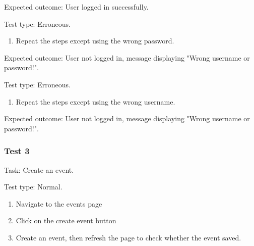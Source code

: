 {\sffamily Expected outcome:} User logged in successfully. \\

{\color{gray} \hrulefill}

{\sffamily Test type: Erroneous.}\\

\begin{enumerate}
  \item Repeat the steps except using the wrong password.
\end{enumerate}

{\sffamily Expected outcome:} User not logged in,
message displaying "Wrong username or password!". \\

{\color{gray} \hrulefill}

{\sffamily Test type: Erroneous.}\\

\begin{enumerate}
  \item Repeat the steps except using the wrong username.
\end{enumerate}

{\sffamily Expected outcome:} User not logged in,
message displaying "Wrong username or password!". \\

{\color{gray} \hrulefill}

\vspace{0.2cm}

\subsubsection{Test 3}

{\sffamily Task:} Create an event.\\

{\color{gray} \hrulefill}

{\sffamily Test type: Normal.} \\

\begin{enumerate}
  \item Navigate to the events page \\
  \item Click on the create event button \\
  \item Create an event, then refresh the page to check whether the event saved. \\
\end{enumerate}


